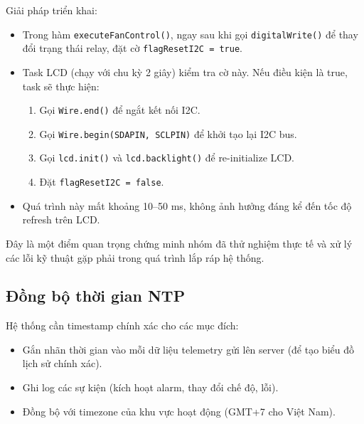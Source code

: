 \documentclass[../BTL_PTIT.tex]{subfiles}
\begin{document}
Giải pháp triển khai:
\begin{itemize}[label=\textbullet]
    \item Trong hàm \texttt{executeFanControl()}, ngay sau khi gọi \texttt{digitalWrite()} để thay đổi trạng thái relay, đặt cờ \texttt{flagResetI2C = true}.
    \item Task LCD (chạy với chu kỳ 2 giây) kiểm tra cờ này. Nếu điều kiện là true, task sẽ thực hiện:
    \begin{enumerate}[label=\arabic*.]
        \item Gọi \texttt{Wire.end()} để ngắt kết nối I2C.
        \item Gọi \texttt{Wire.begin(SDA\textunderscore PIN, SCL\textunderscore PIN)} để khởi tạo lại I2C bus.
        \item Gọi \texttt{lcd.init()} và \texttt{lcd.backlight()} để re-initialize LCD.
        \item Đặt \texttt{flagResetI2C = false}.
    \end{enumerate}
    \item Quá trình này mất khoảng 10–50 ms, không ảnh hưởng đáng kể đến tốc độ refresh trên LCD.
\end{itemize}

Đây là một điểm quan trọng chứng minh nhóm đã thử nghiệm thực tế và xử lý các lỗi kỹ thuật gặp phải trong quá trình lắp ráp hệ thống.

\subsection{Đồng bộ thời gian NTP}
Hệ thống cần timestamp chính xác cho các mục đích:
\begin{itemize}[label=\textbullet]
    \item Gắn nhãn thời gian vào mỗi dữ liệu telemetry gửi lên server (để tạo biểu đồ lịch sử chính xác).
    \item Ghi log các sự kiện (kích hoạt alarm, thay đổi chế độ, lỗi).
    \item Đồng bộ với timezone của khu vực hoạt động (GMT+7 cho Việt Nam).
\end{itemize}
\end{document}
